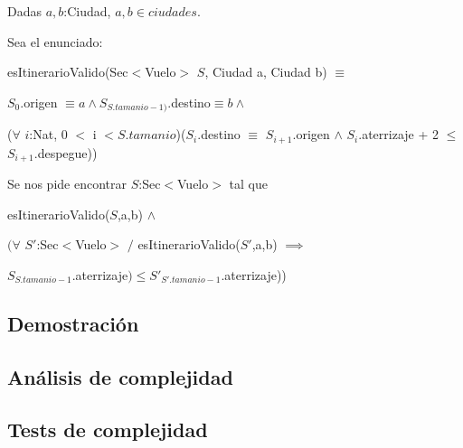 Dadas $a,b$:Ciudad, $a,b \in ciudades$. 

Sea el enunciado:

esItinerarioValido(Sec$<$Vuelo$>$ $S$, Ciudad a, Ciudad b) $\equiv$

 
$S_{0}$.origen $\equiv a \wedge S_{S.tamanio-1)}$.destino$ \equiv b \wedge$ 

($\forall$ $i$:Nat, 0 $<$ i $<S.tamanio$)($S_{i}$.destino $\equiv$ $S_{i+1}$.origen $\wedge$ $S_{i}$.aterrizaje + 2 $\leq$ $S_{i+1}$.despegue))

Se nos pide encontrar $S$:Sec$<$Vuelo$>$ tal que 

esItinerarioValido($S$,a,b) $\wedge$ 

$(\forall$ $S'$:Sec$<$Vuelo$>$ $/$ esItinerarioValido($S'$,a,b) $\implies$  

$S_{S.tamanio-1}$.aterrizaje$) \leq S'_{S'.tamanio-1}$.aterrizaje))

\subsection{Demostración}

\subsection{Análisis de complejidad}

\subsection{Tests de complejidad}
